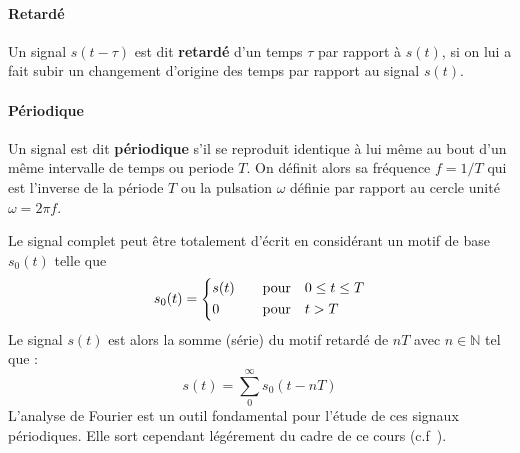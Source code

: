 \paragraph{Retardé}
Un signal $s(t-\tau)$ est dit \textbf{retardé} d'un temps $\tau$ 
par rapport à $s(t)$, si on lui a fait subir un changement
d'origine des temps par rapport au signal $s(t)$.
\begin{center}
    
\end{center}
\paragraph{Périodique}
Un signal est dit \textbf{périodique} s'il se reproduit identique à lui
même au bout d'un même intervalle de temps ou periode $T$. On définit alors 
sa fréquence $f=1/T$ qui est l'inverse de la période $T$ ou la pulsation 
$\omega$ définie par rapport au cercle unité $\omega=2\pi f$.
\begin{figure}[!htb]
    \centering
    
\end{figure}
Le signal complet peut être totalement d'écrit en considérant un motif de base 
$s_0(t)$ telle que
\begin{align*}
    s_0(t) =
    \begin{dcases}
        s(t)&\quad\text{pour}\quad 0\le t\le T   \\
        0&\quad\text{pour}\quad t>T
    \end{dcases}
\end{align*}
Le signal $s(t)$ est alors la somme (série) du motif retardé de $nT$ 
avec $n\in\mathbb{N}$ tel que :
\[
s(t)=\sum_0^\infty s_0(t-nT)
\]
L'analyse de Fourier est un outil fondamental pour l'étude 
de ces signaux périodiques. Elle sort cependant légérement du cadre de 
ce cours (c.f~).
